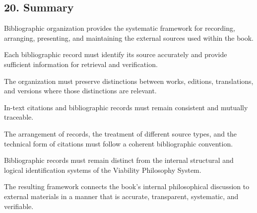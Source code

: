 \subsection*{20. Summary}

Bibliographic organization
provides the systematic
framework for recording,
arranging, presenting,
and maintaining the
external sources used
within the book.

Each bibliographic
record must identify
its source accurately
and provide sufficient
information for
retrieval and verification.

The organization
must preserve distinctions
between works, editions,
translations, and
versions where
those distinctions
are relevant.

In-text citations
and bibliographic
records must remain
consistent and
mutually traceable.

The arrangement
of records, the
treatment of different
source types, and
the technical form
of citations must
follow a coherent
bibliographic convention.

Bibliographic records
must remain distinct
from the internal
structural and
logical identification
systems of the
Viability Philosophy
System.

The resulting framework
connects the book's
internal philosophical
discussion to external
materials in a manner
that is accurate,
transparent, systematic,
and verifiable.

\cleardoublepage

